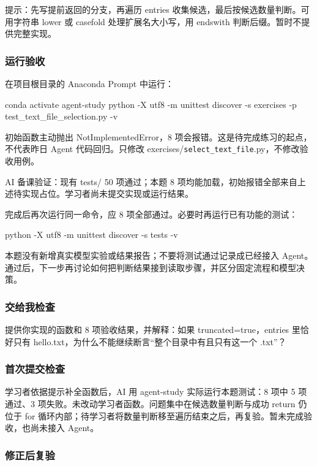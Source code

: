 提示：先写提前返回的分支，再遍历 entries 收集候选，最后按候选数量判断。可用字符串 lower 或 casefold 处理扩展名大小写，用 endswith 判断后缀。暂时不提供完整实现。

\subsubsection{运行验收}

在项目根目录的 Anaconda Prompt 中运行：

\begin{Code}
conda activate agent-study
python -X utf8 -m unittest discover -s exercises -p test_text_file_selection.py -v
\end{Code}

初始函数主动抛出 NotImplementedError，8 项会报错。这是待完成练习的起点，不代表昨日 Agent 代码回归。只修改 exercises/\nolinkurl{select_text_file}.py，不修改验收用例。

AI 备课验证：现有 tests/ 50 项通过；本题 8 项均能加载，初始报错全部来自上述待实现占位。学习者尚未提交实现或运行结果。

完成后再次运行同一命令，应 8 项全部通过。必要时再运行已有功能的测试：

\begin{Code}
python -X utf8 -m unittest discover -s tests -v
\end{Code}

本题没有新增真实模型实验或结果报告；不要将测试通过记录成已经接入 Agent。通过后，下一步再讨论如何把判断结果接到读取步骤，并区分固定流程和模型决策。

\subsubsection{交给我检查}

提供你实现的函数和 8 项验收结果，并解释：如果 truncated=true，entries 里恰好只有 hello.txt，为什么不能继续断言“整个目录中有且只有这一个 .txt”？

\subsubsection{首次提交检查}

学习者依据提示补全函数后，AI 用 agent-study 实际运行本题测试：8 项中 5 项通过、3 项失败。未改动学习者函数。问题集中在候选数量判断与成功 return 仍位于 for 循环内部；待学习者将数量判断移至遍历结束之后，再复验。暂未完成验收，也尚未接入 Agent。

\subsubsection{修正后复验}

